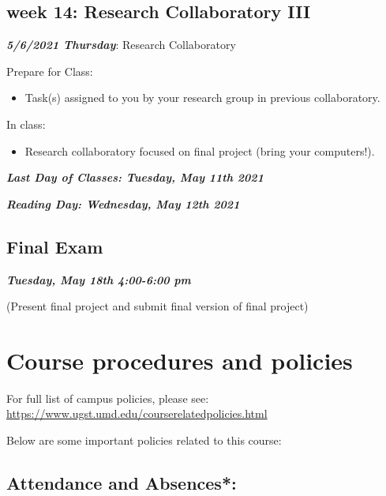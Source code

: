 \documentclass[
]{book}
\providecommand{\tightlist}{%
  \setlength{\itemsep}{0pt}\setlength{\parskip}{0pt}}
\begin{document}
\hypertarget{week-14-research-collaboratory-iii}{%
\subsection{week 14: Research Collaboratory III}\label{week-14-research-collaboratory-iii}}

\textbf{\emph{5/6/2021 Thursday}}: Research Collaboratory

Prepare for Class:

\begin{itemize}
\tightlist
\item
  Task(s) assigned to you by your research group in previous collaboratory.
\end{itemize}

In class:

\begin{itemize}
\tightlist
\item
  Research collaboratory focused on final project (bring your computers!).
\end{itemize}

\textbf{\emph{Last Day of Classes: Tuesday, May 11th 2021}}

\textbf{\emph{Reading Day: Wednesday, May 12th 2021}}

\hypertarget{final-exam}{%
\subsection{Final Exam}\label{final-exam}}

\textbf{\emph{Tuesday, May 18th 4:00-6:00 pm}}

(Present final project and submit final version of final project)

\hypertarget{course-procedures-and-policies}{%
\section{Course procedures and policies}\label{course-procedures-and-policies}}

For full list of campus policies, please see: \url{https://www.ugst.umd.edu/courserelatedpolicies.html}

Below are some important policies related to this course:

\hypertarget{attendance-and-absences}{%
\subsection{Attendance and Absences*:}\label{attendance-and-absences}}
\end{document}
